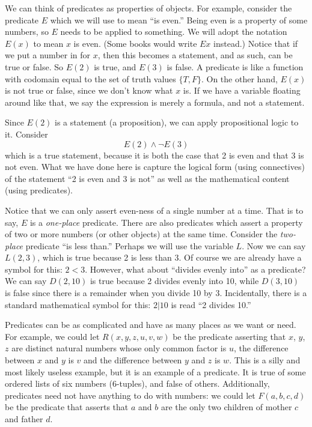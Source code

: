 \documentclass[12pt]{article}
\begin{document}
We can think of predicates as properties of objects.  For example, consider the predicate $E$ which we will use to mean ``is even.''  Being even is a property of some numbers, so $E$ needs to be applied to something.  We will adopt the notation $E(x)$ to mean $x$ is even.  (Some books would write $Ex$ instead.)  Notice that if we put a number in for $x$, then this becomes a statement, and as such, can be true or false.  So $E(2)$ is true, and $E(3)$ is false.  A predicate is like a function with codomain equal to the set of truth values $\{T, F\}$.  On the other hand, $E(x)$ is not true or false, since we don't know what $x$ is.  If we have a variable floating around like that, we say the expression is merely a formula, and not a statement.

Since $E(2)$ is a statement (a proposition), we can apply propositional logic to it.  Consider
\[E(2) \wedge \neg E(3)\]
which is a true statement, because it is both the case that 2 is even and that 3 is not even.  What we have done here is capture the logical form (using connectives) of the statement ``2 is even and 3 is not'' as well as the mathematical content (using predicates).

Notice that we can only assert even-ness of a single number at a time.  That is to say, $E$ is a {\em one-place} predicate.  There are also predicates which assert a property of two or more numbers (or other objects) at the same time.  Consider the {\em two-place} predicate ``is less than.''  Perhaps we will use the variable $L$.  Now we can say $L(2,3)$, which is true because 2 is less than 3.  Of course we are already have a symbol for this: $2 < 3$.  However, what about ``divides evenly into'' as a predicate?  We can say $D(2,10)$ is true because 2 divides evenly into 10, while $D(3, 10)$ is false since there is a remainder when you divide 10 by 3.  Incidentally, there is a standard mathematical symbol for this: $2 | 10$ is read ``2 divides 10.''

Predicates can be as complicated and have as many places as we want or need.  For example, we could let $R(x,y,z,u,v,w)$ be the predicate asserting that $x$, $y$, $z$ are distinct natural numbers whose only common factor is $u$, the difference between $x$ and $y$ is $v$ and the difference between $y$ and $z$ is $w$.  This is a silly and most likely useless example, but it is an example of a predicate.  It is true of some ordered lists of six numbers (6-tuples), and false of others.  Additionally, predicates need not have anything to do with numbers: we could let $F(a,b,c,d)$ be the predicate that asserts that $a$ and $b$ are the only two children of mother $c$ and father $d$.
\end{document}
